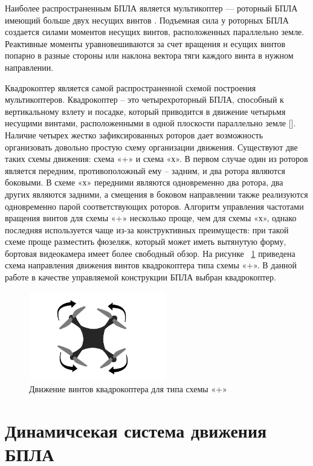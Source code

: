 \documentclass[nir, och, master]{SCWorks}
\begin{document}
Наиболее распространенным БПЛА является мультикоптер --- роторный БПЛА имеющий больше двух 
несущих винтов \cite{}. Подъемная сила у роторных БПЛА создается силами моментов несущих винтов, 
расположенных параллельно земле. Реактивные моменты уравновешиваются за счет вращения н
есущих винтов попарно в разные стороны или наклона вектора тяги каждого винта в нужном 
направлении.

Квадрокоптер является самой распространенной схемой построения мультикоптеров. 
Квадрокоптер – это четырехроторный БПЛА, способный к вертикальному взлету и посадке, 
который приводится в движение четырьмя несущими винтами, расположенными в одной 
плоскости параллельно земле []. Наличие четырех жестко зафиксированных роторов дает 
возможность организовать довольно простую схему организации движения. Существуют 
две таких схемы движения: схема «+» и схема «х». В первом случае один из роторов 
является передним, противоположный ему – задним, и два ротора являются боковыми. 
В схеме «х» передними являются одновременно два ротора, два других являются задними, 
а смещения в боковом направлении также реализуются одновременно парой соответствующих 
роторов. Алгоритм управления частотами вращения винтов для схемы «+» несколько проще, 
чем для схемы «х», однако последняя используется чаще из-за конструктивных преимуществ: 
при такой схеме проще разместить фюзеляж, который может иметь вытянутую форму, бортовая 
видеокамера имеет более свободный обзор. На рисунке ~\ref{drone} приведена схема направления 
движения винтов квадрокоптера типа схемы «+». В данной работе в качестве управляемой 
конструкции БПЛА выбран квадрокоптер.

\begin{figure}[!ht]
	\centering
	\includegraphics[width=6cm]{img/drone pic.png}
	\caption{\label{drone}%
	Движение винтов квадрокоптера для типа схемы «+»}
\end{figure}


\section{Динамичсекая система движения БПЛА}
\end{document}
